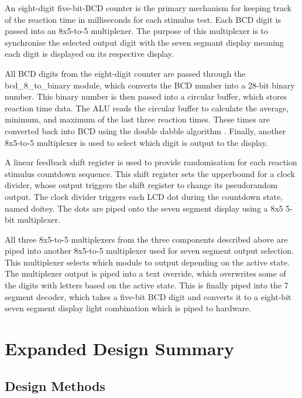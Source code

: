 \documentclass[11pt]{article}
\begin{document}
An eight-digit five-bit-BCD counter is the primary mechanism for keeping track of the reaction time in milliseconds for each stimulus test. Each BCD digit is passed into an 8x5-to-5 multiplexer. The purpose of this multiplexer is to synchronise the selected output digit with the seven segmant display meaning each digit is displayed on its respective display.

All BCD digits from the eight-digit counter are passed through the bcd\_8\_to\_binary module, which converts the BCD number into a 28-bit binary number. This binary number is then passed into a circular buffer, which stores reaction time data. The ALU reads the circular buffer to calculate the average, minimum, and maximum of the last three reaction times. These times are converted back into BCD using the double dabble algorithm \cite{double_dabble}. Finally, another 8x5-to-5 multiplexer is used to select which digit is output to the display.

A linear feedback shift register is used to provide randomisation for each reaction stimulus countdown sequence. This shift register sets the upperbound for a clock divider, whose output triggers the shift register to change its pseudorandom output. The clock divider triggers each LCD dot during the countdown state, named doitey. The dots are piped onto the seven segment display using a 8x5 5-bit multiplexer.

All three 8x5-to-5 multiplexers from the three components described above are piped into another 8x5-to-5 multiplexer used for seven segment output selection. This multiplexer selects which module to output depending on the active state. The multiplexer output is piped into a text override, which overwrites some of the digits with letters based on the active state. This is finally piped into the 7 segment decoder, which takes a five-bit BCD digit and converts it to a eight-bit seven segment display light combination which is piped to hardware.

\section{Expanded Design Summary}

\subsection{Design Methods}
\end{document}
